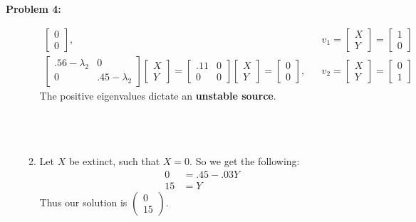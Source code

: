 \documentclass[11pt]{article}
\newenvironment{problem}[1]{\textbf{Problem #1: }}{\newpage}
\begin{document}
\begin{problem}{4}
\begin{enumerate}[label = (\alph*)]
\begin{enumerate}[label = (\roman*)]
\begin{align*}
					\begin{bmatrix}
					0 \\ 0
					\end{bmatrix}, && v_1 = \begin{bmatrix}
					X \\ Y
					\end{bmatrix} = 
					\begin{bmatrix}
					1 \\ 0
					\end{bmatrix}
					\\ 
					\begin{bmatrix}
					.56 - \lambda_2 & 0 \\ 0 & .45-\lambda_2
					\end{bmatrix}\begin{bmatrix}
					X \\ Y
					\end{bmatrix} = 
					\begin{bmatrix}
					.11 & 0 \\ 0 & 0
					\end{bmatrix}\begin{bmatrix}
					X \\ Y
					\end{bmatrix} = 
					\begin{bmatrix}
					0 \\ 0
					\end{bmatrix}, && v_2 = \begin{bmatrix}
					X \\ Y
					\end{bmatrix} = 
					\begin{bmatrix}
					0 \\ 1
					\end{bmatrix}
				\end{align*}
				The positive eigenvalues dictate an \textbf{unstable source}.
				\\ \\ \\ \\
				\item Let $X$ be extinct, such that $X = 0$.  So we get the following:
				\begin{align*}
					0 &= .45 - .03Y \\
					15 &= Y
				\end{align*}
				Thus our solution is $\begin{pmatrix}
					0 \\ 15
				\end{pmatrix}$.

\end{enumerate}
\end{enumerate}
\end{problem}
\end{document}
